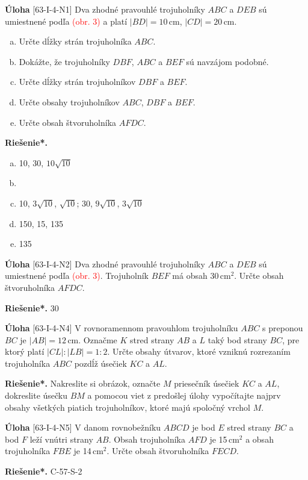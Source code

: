 \documentclass{article}
\newcommand{\rieh}{\textbf{Riešenie*.} }
\newcommand\todo[1]{\noindent\textcolor{red}{(#1)}}
\newcommand{\problem}[3]{
  \begin{tcolorbox}[breakable,notitle,boxrule=0pt,colback=light-gray,colframe=light-gray]
    \textbf{Úloha}
    [#1] #2
  \end{tcolorbox}
  \noindent#3
}
\begin{document}
\problem{63-I-4-N1}{
Dva zhodné pravouhlé trojuholníky $ABC$ a $DEB$ sú umiestnené podľa \todo{obr. 3} a platí $|BD| = 10$\,cm, $|CD| = 20$\,cm.
\begin{enumerate}[a)]
    \item Určte dĺžky strán trojuholníka $ABC$. 
    \item Dokážte, že trojuholníky $DBF$, $ABC$ a $BEF$ sú navzájom podobné.
    \item Určte dĺžky strán trojuholníkov $DBF$ a $BEF$. 
    \item Určte obsahy trojuholníkov $ABC$, $DBF$ a $BEF$. 
    \item Určte obsah štvoruholníka $AFDC$. 
\end{enumerate}
}{
\rieh \begin{enumerate}[a)]
    \item 10, 30, $10\sqrt{10}$
    \item
    \item 10, $3\sqrt{10}$, $\sqrt{10}$; 30, $9\sqrt{10}$, $3\sqrt{10}$
    \item 150, 15, 135
    \item 135
\end{enumerate}
}


\problem{63-I-4-N2}{
Dva zhodné pravouhlé trojuholníky $ABC$ a $DEB$ sú umiestnené podľa \todo{obr. 3}. Trojuholník $BEF$ má obsah 30\,cm$^2$. Určte obsah štvoruholníka $AFDC$.
}{
\rieh 30
}

\problem{63-I-4-N4}{
V rovnoramennom pravouhlom trojuholníku $ABC$ s preponou $BC$ je $|AB| = 12$\,cm. Označme $K$ stred strany $AB$ a $L$ taký bod strany $BC$, pre ktorý platí $|CL| : |LB|= 1 : 2$. Určte obsahy útvarov, ktoré vzniknú rozrezaním trojuholníka $ABC$ pozdĺž úsečiek $KC$ a $AL$.
}{
\rieh Nakreslite si obrázok, označte $M$ priesečník úsečiek $KC$ a $AL$, dokreslite úsečku $BM$ a pomocou viet z predošlej úlohy vypočítajte najprv obsahy všetkých piatich trojuholníkov, ktoré majú spoločný vrchol $M$.
}


\problem{63-I-4-N5}{
V danom rovnobežníku $ABCD$ je bod $E$ stred strany $BC$ a bod $F$ leží vnútri strany $AB$. Obsah trojuholníka $AFD$ je 15\,cm$^2$ a obsah trojuholníka $FBE$ je 14\,cm$^2$. Určte obsah štvoruholníka $FECD$.
}{
\rieh C-57-S-2
}
\end{document}
